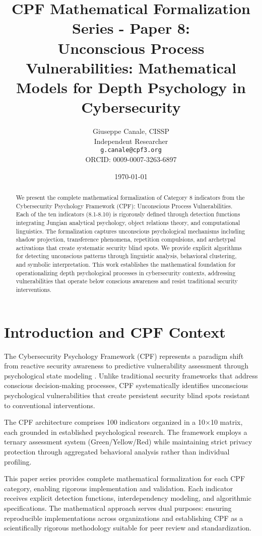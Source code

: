 \documentclass[11pt,a4paper]{article}
\title{CPF Mathematical Formalization Series - Paper 8:\\Unconscious Process Vulnerabilities: Mathematical Models for Depth Psychology in Cybersecurity}
\author{
    Giuseppe Canale, CISSP\\
    Independent Researcher\\
    \texttt{g.canale@cpf3.org}\\
    ORCID: 0009-0007-3263-6897
}
\date{\today}
\begin{document}
\maketitle

\begin{abstract}
We present the complete mathematical formalization of Category 8 indicators from the Cybersecurity Psychology Framework (CPF): Unconscious Process Vulnerabilities. Each of the ten indicators (8.1-8.10) is rigorously defined through detection functions integrating Jungian analytical psychology, object relations theory, and computational linguistics. The formalization captures unconscious psychological mechanisms including shadow projection, transference phenomena, repetition compulsions, and archetypal activations that create systematic security blind spots. We provide explicit algorithms for detecting unconscious patterns through linguistic analysis, behavioral clustering, and symbolic interpretation. This work establishes the mathematical foundation for operationalizing depth psychological processes in cybersecurity contexts, addressing vulnerabilities that operate below conscious awareness and resist traditional security interventions.
\end{abstract}

\section{Introduction and CPF Context}

The Cybersecurity Psychology Framework (CPF) represents a paradigm shift from reactive security awareness to predictive vulnerability assessment through psychological state modeling \cite{canale2024cpf}. Unlike traditional security frameworks that address conscious decision-making processes, CPF systematically identifies unconscious psychological vulnerabilities that create persistent security blind spots resistant to conventional interventions.

The CPF architecture comprises 100 indicators organized in a 10×10 matrix, each grounded in established psychological research. The framework employs a ternary assessment system (Green/Yellow/Red) while maintaining strict privacy protection through aggregated behavioral analysis rather than individual profiling.

This paper series provides complete mathematical formalization for each CPF category, enabling rigorous implementation and validation. Each indicator receives explicit detection functions, interdependency modeling, and algorithmic specifications. The mathematical approach serves dual purposes: ensuring reproducible implementations across organizations and establishing CPF as a scientifically rigorous methodology suitable for peer review and standardization.
\end{document}
